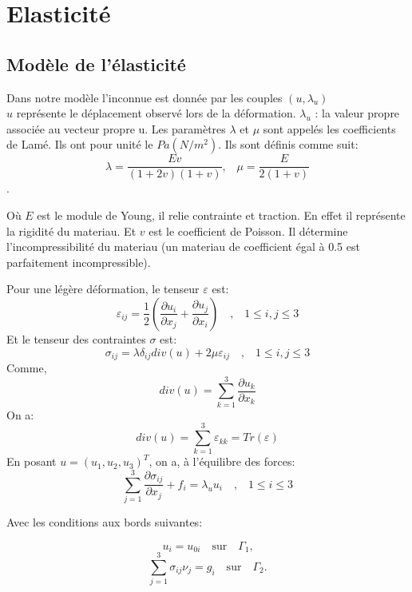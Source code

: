 \documentclass[a4paper,11pt]{article}   %
\begin{document}
  \section{Elasticité}


  \subsection{Modèle de l'élasticité}

 Dans notre modèle l'inconnue est donnée par les couples $(u,\lambda _u)$ \\
 $u$  représente le déplacement observé lors de la déformation.
 $\lambda_u$ : la valeur propre associée au vecteur propre u.
 Les paramètres $\lambda$ et $\mu$ sont appelés les coefficients de Lamé.
 Ils ont pour unité le  $Pa (N/m^2)$.
 Ils sont définis comme suit: 
\begin{equation}
\label{lame}
 \lambda=\frac{Ev}{(1+2v)(1+v)}  \text{,} \quad \mu=\frac{E}{2(1+v)} 
 \end{equation}.

Où $E$ est le module de Young, il relie contrainte et traction.
En effet il représente la rigidité du materiau.
Et $v$ est le coefficient de Poisson.
Il détermine l'incompressibilité du materiau (un materiau de coefficient égal à 0.5 est parfaitement incompressible).

Pour une légère déformation, le tenseur $\varepsilon$ est:
\begin{equation}
\label{deform}
\varepsilon_{ij} =\frac{1}{2}(\frac{\partial u_i}{\partial x_j}+\frac{\partial u_j}{\partial x_i}) \quad \text{,} \quad 1\leq i,j \leq 3
\end{equation}
Et le tenseur des contraintes $\sigma$ est:
\begin{equation}
\label{contrainte}
\sigma_{ij}=\lambda \delta_{ij} div(u) +2\mu \varepsilon_{ij} \quad \text{,} \quad 1\leq i,j \leq 3
\end{equation}
Comme, \[ div (u)= \sum_{k=1}^3 \frac{\partial u_k}{\partial x_k} \]
On a: \[ div(u) = \sum_{k=1}^3 \varepsilon_{kk}  =Tr(\varepsilon) \]
En posant $u=(u_1,u_2,u_3)^T$,
on a, à l'équilibre des forces:
\begin{equation}
\label{model}
\sum_{j=1}^3 \frac{\partial \sigma_{ij}}{\partial x_j}  + f_i = \lambda _u u_i \quad \text{,} \quad 1\leq i \leq3
\end{equation}

Avec les conditions aux bords suivantes:

\[u_i = u_{0i} \quad \text{sur} \quad \Gamma_1 \text{,} \]
\[\sum_{j=1}^3 \sigma_{ij}\nu_j  = g_i \quad \text{sur} \quad \Gamma_2 \text{.}\]
\end{document}

